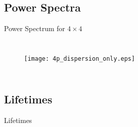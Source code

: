 \documentclass{beamer}
\begin{document}
\subsection{Power Spectra}
\begin{frame}{Power Spectrum for $4 \times 4$}
\begin{columns}
\begin{figure}[t]
\vspace*{-1cm}
\hspace*{-0.9cm}
\texttt{[image: 4p\_dispersion\_only.eps]}
\renewcommand{\figure}{Fig.}
\label{fig:disp_4p}
\end{figure}
\begin{figure}[t]
\vspace*{-1.2cm}
\hspace*{1.9cm}
\renewcommand{\figure}{Fig.}
\label{fig:sed}
\end{figure}
\end{columns}
\end{frame}

\subsection{Lifetimes}
\begin{frame}{Lifetimes}
\begin{figure}[!h]
\begin{center}
\vspace*{-0.8cm}
\hspace*{-1cm}
\renewcommand{\figure}{Fig.}
\label{fig:lifetimes}
\end{center}
\end{figure}
\end{frame}

\end{document}
